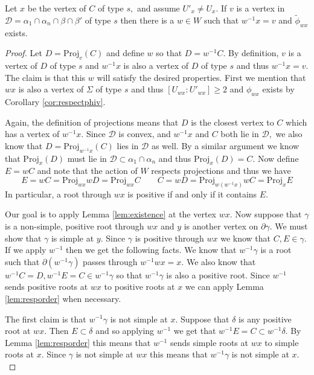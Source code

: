 \documentclass[class=book, crop=false,12 pt]{standalone}
\begin{document}
\begin{lemma}
	\label{lem:Dexists}
	Let $x$ be the vertex of $C$ of type $s,$ and assume $U'_x\neq U_x.$ If $v$ is a vertex in $\mathcal{D}=\alpha_1\cap \alpha_n\cap \beta \cap \beta'$ of type $s$ then there is a $w\in W$ such that $w^{-1}x=v$ and $\tilde{\phi}_{wx}$ exists.
\end{lemma}
\begin{proof}
	Let $D=\mathrm{Proj}_{v}(C)$ and define $w$ so that $D=w^{-1}C.$ By definition, $v$ is a vertex of $D$ of type $s$ and $w^{-1}x$ is also a vertex of $D$ of type $s$ and thus $w^{-1}x=v.$ The claim is that this $w$ will satisfy the desired properties. First we mention that $wx$ is also a vertex of $\Sigma$ of type $s$ and thus $[U_{wx}:U'_{wx}]\ge 2$ and $\phi_{wx}$ exists by Corollary \ref{cor:respectphiv}. 
	
	Again, the definition of projections means that $D$ is the closest vertex to $C$ which has a vertex of $w^{-1}x.$ Since $\mathcal{D}$ is convex, and $w^{-1}x$ and $C$ both lie in $\mathcal{D},$ we also know that $D=\mathrm{Proj}_{w^{-1}x}(C)$ lies in $\mathcal{D}$ as well. By a similar argument we know that $\mathrm{Proj}_{x}(D)$ must lie in $\mathcal{D}\subset \alpha_1\cap \alpha_n$ and thus $\mathrm{Proj}_{x}(D)=C.$ Now define $E=wC$ and note that the action of $W$ respects projections and thus we have
	\[
		E=wC=\mathrm{Proj}_{wx}{wD}=\mathrm{Proj}_{wx}{C} \qquad C=wD=\mathrm{Proj}_{w(w^{-1}x)}{wC}=\mathrm{Proj}_{x}{E}
	\]
In particular, a root through $wx$ is positive if and only if it contains $E.$

Our goal is to apply Lemma \ref{lem:existence} at the vertex $wx.$ Now suppose that $\gamma$ is a non-simple, positive root through $wx$ and $y$ is another vertex on $\partial \gamma.$ We must show that $\gamma$ is simple at $y.$ Since $\gamma$ is positive through $wx$ we know that $C,E\in \gamma.$ If we apply $w^{-1}$ then we get the following facts. We know that $w^{-1}\gamma$ is a root such that $\partial (w^{-1}\gamma)$ passes through $w^{-1}wx=x.$ We also know that $w^{-1}C=D,w^{-1}E=C\in w^{-1}\gamma$ so that $w^{-1}\gamma$ is also a positive root. Since $w^{-1}$ sends positive roots at $wx$ to positive roots at $x$ we can apply Lemma \ref{lem:resporder} when necessary.

The first claim is that $w^{-1}\gamma$ is not simple at $x.$ Suppose that $\delta$ is any positive root at $wx.$ Then $E\subset \delta$ and so applying $w^{-1}$ we get that $w^{-1}E=C\subset w^{-1}\delta.$  By Lemma \ref{lem:resporder} this means that $w^{-1}$ sends simple roots at $wx$ to simple roots at $x.$ Since $\gamma$ is not simple at $wx$ this means that $w^{-1}\gamma$ is not simple at $x.$


\end{proof}
\end{document}
